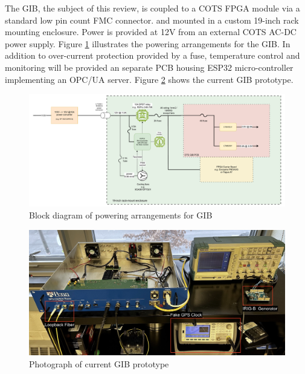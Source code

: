 \documentclass[fleqn,12pt,a4paper]{olplainarticle}
\begin{document}
The GIB, the subject of this review, is coupled to a COTS FPGA module via a standard low pin count FMC connector\cite{ref:fmc}.
and mounted in a custom 19-inch rack mounting enclosure. Power is provided at 12V from an external COTS AC-DC power supply. Figure \ref{fig:dts_gib_power_block_diagram} illustrates the powering arrangements for the GIB. In addition to over-current protection provided by a fuse, temperature control and monitoring will be provided an separate PCB housing ESP32 micro-controller implementing an  OPC/UA server\cite{ref:opc_ua}. Figure \ref{fig:dts_gibV1_photo} shows the current GIB prototype.

\begin{figure}[ht]
\centering
\includegraphics[width=\linewidth]{dts_gib_power_block_diagram_v3-250411.drawio.pdf}
\caption{Block diagram of powering arrangements for GIB}
\label{fig:dts_gib_power_block_diagram}
\end{figure}

\begin{figure}[ht]
\centering
\includegraphics[width=0.85\linewidth]{gib_teststand_setup_annotated.JPG}
\caption{Photograph of current GIB prototype}
\label{fig:dts_gibV1_photo}
\end{figure}
\end{document}
